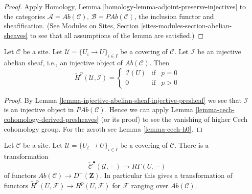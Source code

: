 \begin{proof}
Apply Homology, Lemma \ref{homology-lemma-adjoint-preserve-injectives}
to the categories $\mathcal{A} = \textit{Ab}(\mathcal{C})$,
$\mathcal{B} = \textit{PAb}(\mathcal{C})$, the inclusion functor
and sheafification. (See
Modules on Sites, Section \ref{sites-modules-section-abelian-sheaves} to see
that all assumptions of the lemma are satisfied.)
\end{proof}

\begin{lemma}
\label{lemma-injective-trivial-cech}
Let $\mathcal{C}$ be a site.
Let $\mathcal{U} = \{U_i \to U\}_{i \in I}$ be a covering of $\mathcal{C}$.
Let $\mathcal{I}$ be an injective abelian sheaf, i.e., an injective
object of $\textit{Ab}(\mathcal{C})$.
Then
$$
\check{H}^p(\mathcal{U}, \mathcal{I}) =
\left\{
\begin{matrix}
\mathcal{I}(U) & \text{if} & p = 0 \\
0 & \text{if} & p > 0
\end{matrix}
\right.
$$
\end{lemma}

\begin{proof}
By Lemma \ref{lemma-injective-abelian-sheaf-injective-presheaf}
we see that $\mathcal{I}$ is an injective object in
$\textit{PAb}(\mathcal{C})$.
Hence we can apply Lemma \ref{lemma-cech-cohomology-derived-presheaves}
(or its proof) to see the vanishing of higher Cech cohomology group.
For the zeroth see Lemma \ref{lemma-cech-h0}.
\end{proof}

\begin{lemma}
\label{lemma-cech-cohomology}
Let $\mathcal{C}$ be a site.
Let $\mathcal{U} = \{U_i \to U\}_{i \in I}$ be a covering of $\mathcal{C}$.
There is a transformation
$$
\check{\mathcal{C}}^\bullet(\mathcal{U}, -)
\longrightarrow
R\Gamma(U, -)
$$
of functors
$\textit{Ab}(\mathcal{C}) \to D^{+}(\mathbf{Z})$.
In particular this gives a transformation of functors
$\check{H}^p(U, \mathcal{F}) \to H^p(U, \mathcal{F})$ for
$\mathcal{F}$ ranging over $\textit{Ab}(\mathcal{C})$.
\end{lemma}

